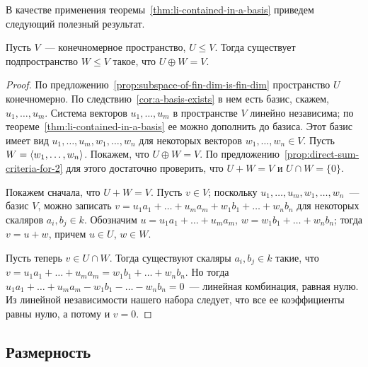 В качестве применения теоремы~\ref{thm:li-contained-in-a-basis} приведем следующий
полезный результат.
\begin{proposition}
Пусть $V$~--- конечномерное пространство, $U\leq V$. Тогда существует
подпространство $W\leq V$ такое, что $U\oplus W = V$.
\end{proposition}
\begin{proof}
По предложению~\ref{prop:subspace-of-fin-dim-is-fin-dim} пространство $U$
конечномерно. По следствию~\ref{cor:a-basis-exists} в нем есть базис,
скажем, $u_1,\dots,u_m$. Система векторов $u_1,\dots,u_m$ в пространстве
$V$ линейно независима; по теореме~\ref{thm:li-contained-in-a-basis}
ее можно дополнить до базиса. Этот базис имеет вид
$u_1,\dots,u_m,w_1,\dots,w_n$ для некоторых векторов $w_1,\dots,w_n\in V$.
Пусть $W = \langle w_1,\dots,w_n\rangle$. Покажем, что $U\oplus W = V$.
По предложению~\ref{prop:direct-sum-criteria-for-2} для этого достаточно
проверить, что $U + W = V$ и $U\cap W = \{0\}$.

Покажем сначала, что $U + W = V$.
Пусть $v\in V$; поскольку $u_1,\dots,u_m,w_1,\dots,w_n$~--- базис $V$,
можно записать
$v = u_1a_1 + \dots + u_ma_m + w_1b_1 + \dots + w_nb_n$
для некоторых скаляров $a_i,b_j\in k$.
Обозначим $u = u_1a_1 + \dots + u_ma_m$, $w = w_1b_1 + \dots + w_nb_n$;
тогда $v = u+w$, причем $u\in U$, $w\in W$.

Пусть теперь $v\in U\cap W$. Тогда существуют скаляры $a_i,b_j\in k$
такие, что $v = u_1a_1 + \dots + u_ma_m = w_1b_1 + \dots + w_nb_n$.
Но тогда $u_1a_1 + \dots + u_ma_m - w_1b_1 - \dots - w_nb_n = 0$~---
линейная комбинация, равная нулю. Из линейной независимости
нашего набора следует, что все ее коэффициенты равны нулю,
а потому и $v=0$.
\end{proof}


\subsection{Размерность}

